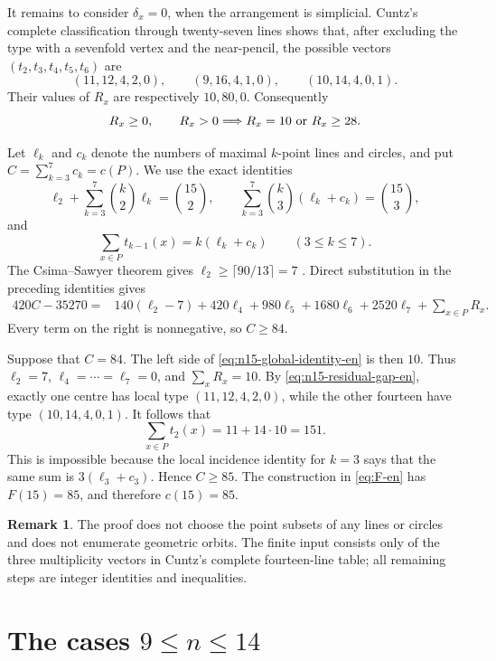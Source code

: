 \documentclass[11pt,a4paper]{article}
\theoremstyle{definition}
\newtheorem{remark}[theorem]{Remark}
\begin{document}
It remains to consider $\delta_x=0$, when the arrangement is simplicial.
Cuntz's complete classification through twenty-seven lines
\cite[Theorem~1.1 and the fourteen-line entries of the invariant table,
p.~696]{cuntz-en} shows that, after excluding the type with a sevenfold vertex
and the near-pencil, the possible vectors $(t_2,t_3,t_4,t_5,t_6)$ are
\[
 (11,12,4,2,0),\qquad(9,16,4,1,0),\qquad(10,14,4,0,1).
\]
Their values of $R_x$ are respectively $10,80,0$.  Consequently
\begin{equation}\label{eq:n15-residual-gap-en}
 R_x\ge0,
 \qquad R_x>0\Longrightarrow R_x=10\ \hbox{or}\ R_x\ge28.
\end{equation}

Let $\ell_k$ and $c_k$ denote the numbers of maximal $k$-point lines and
circles, and put $C=\sum_{k=3}^{7}c_k=c(P)$.  We use the exact identities
\[
 \ell_2+\sum_{k=3}^{7}\binom{k}{2}\ell_k=\binom{15}{2},
 \qquad
 \sum_{k=3}^{7}\binom{k}{3}(\ell_k+c_k)=\binom{15}{3},
\]
and
\[
 \sum_{x\in P}t_{k-1}(x)=k(\ell_k+c_k)\qquad(3\le k\le7).
\]
The Csima--Sawyer theorem gives $\ell_2\ge\lceil90/13\rceil=7$
\cite[the theorem on pp.~187--188]{csima-sawyer-en}.  Direct substitution in
the preceding identities gives
\begin{align}\label{eq:n15-global-identity-en}
420C-35270={}&140(\ell_2-7)+420\ell_4+980\ell_5
 +1680\ell_6+2520\ell_7+\sum_{x\in P}R_x.
\end{align}
Every term on the right is nonnegative, so $C\ge84$.

Suppose that $C=84$.  The left side of
\eqref{eq:n15-global-identity-en} is then $10$.  Thus
$\ell_2=7$, $\ell_4=\cdots=\ell_7=0$, and
$\sum_xR_x=10$.  By \eqref{eq:n15-residual-gap-en}, exactly one centre has
local type $(11,12,4,2,0)$, while the other fourteen have type
$(10,14,4,0,1)$.  It follows that
\[
 \sum_{x\in P}t_2(x)=11+14\cdot10=151.
\]
This is impossible because the local incidence identity for $k=3$ says that
the same sum is $3(\ell_3+c_3)$.  Hence $C\ge85$.  The construction in
\eqref{eq:F-en} has $F(15)=85$, and therefore $c(15)=85$.

\begin{remark}
The proof does not choose the point subsets of any lines or circles and does
not enumerate geometric orbits.  The
finite input consists only of the three multiplicity vectors in Cuntz's
complete fourteen-line table; all remaining steps are integer identities and
inequalities.
\end{remark}

\section{The cases \texorpdfstring{$9\le n\le14$}{9<=n<=14}}
\label{sec:small-uniform-en}
\end{document}
